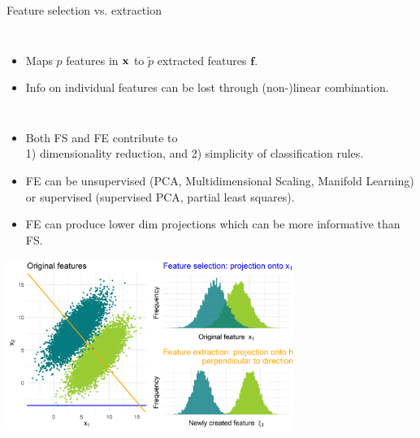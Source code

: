 \documentclass[11pt,compress,t,notes=noshow, xcolor=table]{beamer}
\begin{document}
\begin{vbframe}{Feature selection vs. extraction}
\begin{columns}
      \smallskip

      \begin{itemize}
        \item Maps $p$ features in $\mathbf{x}$ to $\tilde{p}$ extracted features $\bm{f}$.
        \item Info on individual features can be lost through (non-)linear combination.
      \end{itemize}

    \end{columns}


    \framebreak

    
    \begin{itemize}
    \footnotesize
        \item Both FS and FE contribute to\\ 1) dimensionality reduction, and 2) simplicity of classification rules.
        \item FE can be unsupervised (PCA, Multidimensional Scaling, Manifold Learning) or supervised (supervised PCA, partial least squares).        
        \item FE can produce lower dim projections which can be more informative than FS.
    \end{itemize}

    \vspace{0.2cm}


    \begin{center}
     \includegraphics[width = 0.7\textwidth]{figure_man/feature_sel_vs_extr.png}\\
    \end{center}


  \end{vbframe}
\end{document}
